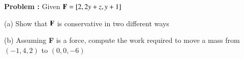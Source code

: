 {\bf Problem :} Given $\text{\bf F} = [2,2y+z,y+1]$

(a) Show that $\text{\bf F}$ is conservative in two different ways


\vspace{19.4cm}

(b) Assuming {\bf F} is a force, compute the work required to move a mass from $(-1,4,2)$ to $(0,0,-6)$
